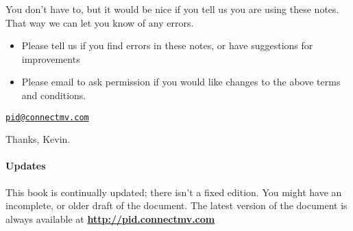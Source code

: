 You don't have to, but it would be nice if you tell us you are using these notes. That way we can let you know of any errors.
\begin{itemize}
	\item	Please tell us if you find errors in these notes, or have suggestions for improvements
	\item	Please email to ask permission if you would like changes to the above terms and conditions.
\end{itemize}

\begin{center}
	{\LARGE \texttt{\href{mailto:pid@connectmv.com}{pid@connectmv.com}}}
\end{center}

Thanks, Kevin.

\vskip48pt

\paragraph{Updates}

This book is continually updated; there isn't a fixed edition. You might have an incomplete, or older draft of the document.  The latest version of the document is always available at \textbf{\href{http://pid.connectmv.com}{http://pid.connectmv.com}}








